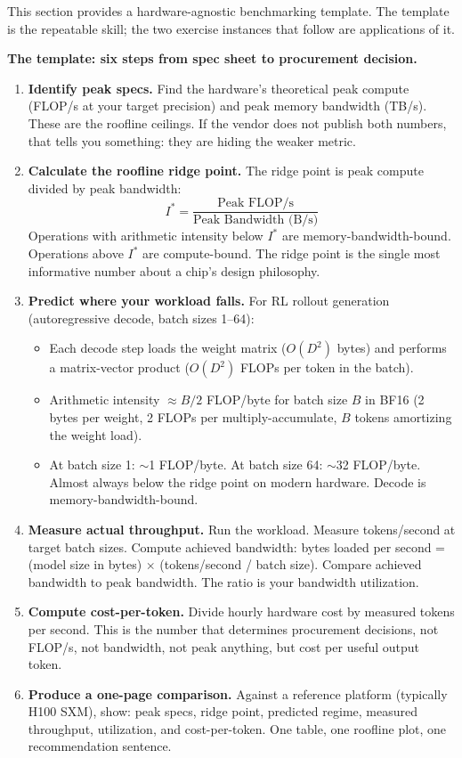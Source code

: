 This section provides a hardware-agnostic benchmarking template. The template is the repeatable skill; the two exercise instances that follow are applications of it.

\textbf{The template: six steps from spec sheet to procurement decision.}

\begin{enumerate}
  \item \textbf{Identify peak specs.} Find the hardware's theoretical peak compute (FLOP/s at your target precision) and peak memory bandwidth (TB/s). These are the roofline ceilings. If the vendor does not publish both numbers, that tells you something: they are hiding the weaker metric.

  \item \textbf{Calculate the roofline ridge point.} The ridge point is peak compute divided by peak bandwidth:
  $$I^* = \frac{\text{Peak FLOP/s}}{\text{Peak Bandwidth (B/s)}}$$
  Operations with arithmetic intensity below $I^*$ are memory-bandwidth-bound. Operations above $I^*$ are compute-bound. The ridge point is the single most informative number about a chip's design philosophy.

  \item \textbf{Predict where your workload falls.} For RL rollout generation (autoregressive decode, batch sizes 1--64):
  \begin{itemize}
    \item Each decode step loads the weight matrix ($O(D^2)$ bytes) and performs a matrix-vector product ($O(D^2)$ FLOPs per token in the batch).
    \item Arithmetic intensity $\approx B/2$ FLOP/byte for batch size $B$ in BF16 (2 bytes per weight, 2 FLOPs per multiply-accumulate, $B$ tokens amortizing the weight load).
    \item At batch size 1: $\sim$1 FLOP/byte. At batch size 64: $\sim$32 FLOP/byte. Almost always below the ridge point on modern hardware. Decode is memory-bandwidth-bound.
  \end{itemize}

  \item \textbf{Measure actual throughput.} Run the workload. Measure tokens/second at target batch sizes. Compute achieved bandwidth: bytes loaded per second = (model size in bytes) $\times$ (tokens/second / batch size). Compare achieved bandwidth to peak bandwidth. The ratio is your bandwidth utilization.

  \item \textbf{Compute cost-per-token.} Divide hourly hardware cost by measured tokens per second. This is the number that determines procurement decisions, not FLOP/s, not bandwidth, not peak anything, but cost per useful output token.

  \item \textbf{Produce a one-page comparison.} Against a reference platform (typically H100 SXM), show: peak specs, ridge point, predicted regime, measured throughput, utilization, and cost-per-token. One table, one roofline plot, one recommendation sentence.
\end{enumerate}

